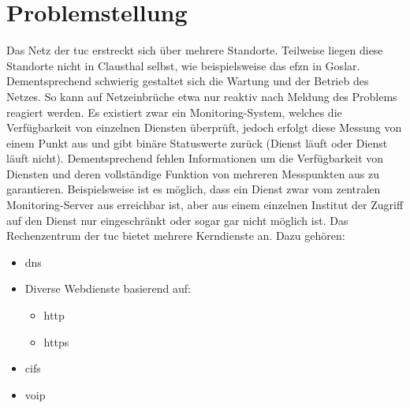 \documentclass[titlepage]{report}
\begin{document}
\chapter*{Problemstellung}
Das Netz der \gls{tuc} erstreckt sich über mehrere
Standorte. Teilweise liegen diese Standorte nicht in Clausthal
selbst, wie beispielsweise das \gls{efzn} in Goslar. Dementsprechend
schwierig gestaltet sich die Wartung und der Betrieb
des Netzes. So kann auf Netzeinbrüche etwa nur reaktiv
nach Meldung des Problems reagiert werden. Es existiert
zwar ein Monitoring-System, welches die Verfügbarkeit von
einzelnen Diensten überprüft, jedoch erfolgt diese Messung
von einem Punkt aus und gibt binäre Statuswerte
zurück (Dienst läuft oder Dienst läuft nicht). Dementsprechend
fehlen Informationen um die Verfügbarkeit von Diensten und
deren vollständige Funktion von mehreren Messpunkten aus
zu garantieren. Beispielsweise ist es möglich, dass ein Dienst
zwar vom zentralen Monitoring-Server aus erreichbar ist, aber
aus einem einzelnen Institut der Zugriff auf den Dienst nur
eingeschränkt oder sogar gar nicht möglich ist. Das Rechenzentrum der
\gls{tuc} bietet mehrere Kerndienste an. Dazu
gehören:
\begin{itemize}
    \item \gls{dns}
    \item Diverse Webdienste basierend auf:
    \begin{itemize}
        \item \gls{http}
        \item \gls{https}
    \end{itemize}
    \item \gls{cifs}
    \item \gls{voip}
\end{itemize}
\end{document}

